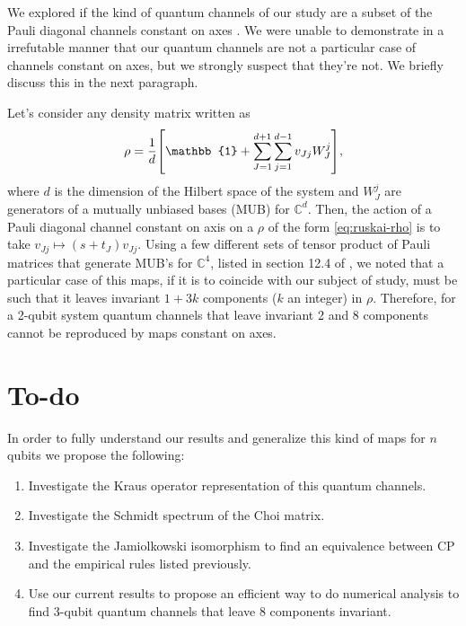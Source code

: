 \documentclass[11pt,dvipsnames]{article} %
\begin{document}
We explored if the kind of quantum channels of our study are a subset 
of the Pauli diagonal channels constant on axes \cite{nathanson2007pauli}.
We were unable to demonstrate in a irrefutable manner that 
our quantum channels are not a particular case of channels constant on axes, 
but we strongly suspect that they're not. We briefly discuss this in the 
next paragraph. 

Let's consider any density matrix written as
\begin{align}
	\rho = \frac{1}{d}\qty[\mathbb{1} + \sum _{J=1}^{d+1} \sum _{j=1}^{d-1}
	v_{Jj}W_J^j],
	\label{eq:ruskai-rho}
\end{align}
where $d$ is the dimension of the Hilbert space of the system and $W_J^j$ 
are generators of a mutually unbiased bases (MUB) for $\mathbb{C}^{d}$. Then,
the action of a Pauli diagonal channel constant on axis on a $\rho$ of the form
\eqref{eq:ruskai-rho} is to take $v_{Jj}\mapsto (s+t_J)v_{Jj}$. Using a few
different sets of tensor product of Pauli matrices that generate MUB's for
$\mathbb{C}^4$, listed in section 12.4 of \cite{bengtsson_zyczkowski_2017}, 
we noted that a particular case of this maps, if it is to coincide with our subject of
study, must be such that it leaves invariant $1+3k$ components ($k$ an integer)
in $\rho$. Therefore, for a 2-qubit system quantum channels that leave 
invariant 2 and 8 components cannot be reproduced by maps constant on axes. 
\section*{To-do} %
In order to fully understand our results and generalize this kind of maps 
for $n$ qubits we propose the following:
\begin{enumerate}
\item Investigate the Kraus operator representation of this quantum channels.
\item Investigate the Schmidt spectrum of the Choi matrix.
\item Investigate the Jamiolkowski isomorphism to find an equivalence between
CP and the empirical rules listed previously.
\item Use our current results to propose an efficient way to do numerical
analysis to find 3-qubit quantum channels that leave 8 components invariant.
\end{enumerate}


\vfill
\end{document}
